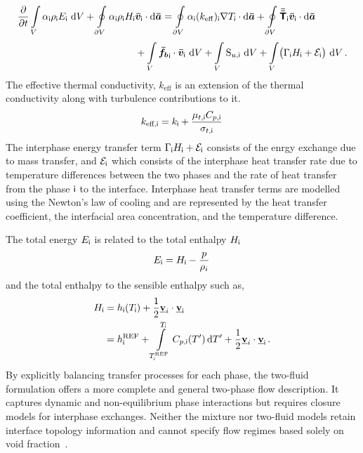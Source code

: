 \begin{align}\label{eq:emp-en}
\displaystyle\frac{\partial{}}{\partial{t}}
\displaystyle\int\limits_{V}^{} \alpha_{\mathsf {i}} \rho_{\mathsf {i}} E_{\mathsf {i}} \,\mathop{}\!\mathrm{d}{V}
+ \displaystyle\oint\limits_{\partial V}^{} \alpha_{\mathsf {i}} \rho_{\mathsf {i}} H_{\mathsf {i}}&
\bm{\bar{v}}_{\mathsf {i}} \cdot \mathop{}\!\mathrm{d}{\bm{\bar{a}}}
 = 
\displaystyle\oint\limits_{\partial V}^{} \alpha_{\mathsf {i}} (k_{\mathrm{eff}})_{\mathsf {i}} \nabla T_{\mathsf {i}} \cdot \mathop{}\!\mathrm{d}{\bm{\bar{a}}}
+ \displaystyle\oint\limits_{\partial V}^{} {\bm{\bar{\bar{\mathsf{T}}}}}_{\mathsf {i}} \bm{\bar{v}}_{\mathsf {i}} \cdot \mathop{}\!\mathrm{d}{\bm{\bar{a}}}\nonumber \\
& + \displaystyle\int\limits_{V}^{} \bm{\bar{f_{b}}}_{\mathsf {i}} \cdot \bm{\bar{v}}_{\mathsf {i}} \,\mathop{}\!\mathrm{d}{V}
+ \displaystyle\int\limits_{V}^{} \mathrm{S}_{u,\mathsf {i}} \,\mathop{}\!\mathrm{d}{V} + \displaystyle\int\limits_{V}^{} \bigl(\Gamma_{\mathsf {i}}H_{\mathsf {i}} + \mathcal{E}_{\mathsf {i}}\bigr)\,\mathop{}\!\mathrm{d}{V}\,.
\end{align} 
The effective thermal conductivity, $k_{\text{eff}}$ is an extension of the thermal conductivity along with 
 turbulence contributions to it. 
\[
  k_{\text{eff},\mathsf {i}} = k_{\mathsf {i}} + \frac{\mu_{t,\mathsf {i}} C_{p,\mathsf {i}}}{\sigma_{t, \mathsf {i}}}\,
\]
The interphase energy transfer term $\Gamma_{\mathsf {i}}H_{\mathsf {i}} + \mathcal{E}_{\mathsf {i}}$
consists of the enrgy exchange due to mass transfer, and $\mathcal{E}_{\mathsf {i}}$ which consists of the 
interphase heat transfer rate due to temperature differences between the two phases and 
the rate of heat transfer from the phase $\mathsf {i}$ to the interface. Interphase heat transfer terms 
are modelled using the Newton's law of cooling and are represented by the heat transfer coefficient,
the interfacial area concentration, and the temperature difference.~\cite{star-ccm+}

The total energy $E_{\mathsf {i}}$ is related to the total enthalpy $H_{\mathsf {i}}$
\[
  E_{\mathsf {i}} = H_{\mathsf {i}} - \frac{p}{\rho_{i}}\,
\]
and the total enthalpy to the sensible enthalpy such as,
\begin{equation}
\begin{split}
  H_{\mathsf {i}} &= h_{\mathsf {i}}(T_{\mathsf {i}}) + \frac{1}{2} \mathbf{\underline{v}}_{i} \cdot \mathbf{\underline{v}}_{\mathsf {i}}\\
  & = h_{\mathsf {i}}^{\text{REF}} + \int\limits_{T_{\mathsf {i}}^{\text{REF}}}^{T_{\mathsf {i}}} C_{p,\mathsf {i}}(T') \,\mathrm{d}T' + \frac{1}{2} \mathbf{\underline{v}}_{i} \cdot \mathbf{\underline{v}}_{\mathsf {i}}\,.
\end{split}
\end{equation}
By explicitly balancing transfer processes for each phase, 
the two-fluid formulation offers a more complete and general two-phase flow description. 
It captures dynamic and non-equilibrium phase interactions but requires closure models for 
interphase exchanges. Neither the mixture nor two-fluid models retain interface topology information 
and cannot specify flow regimes based solely on void fraction~\cite{ishiiThermoFluidDynamicsTwoPhase2011}. 

